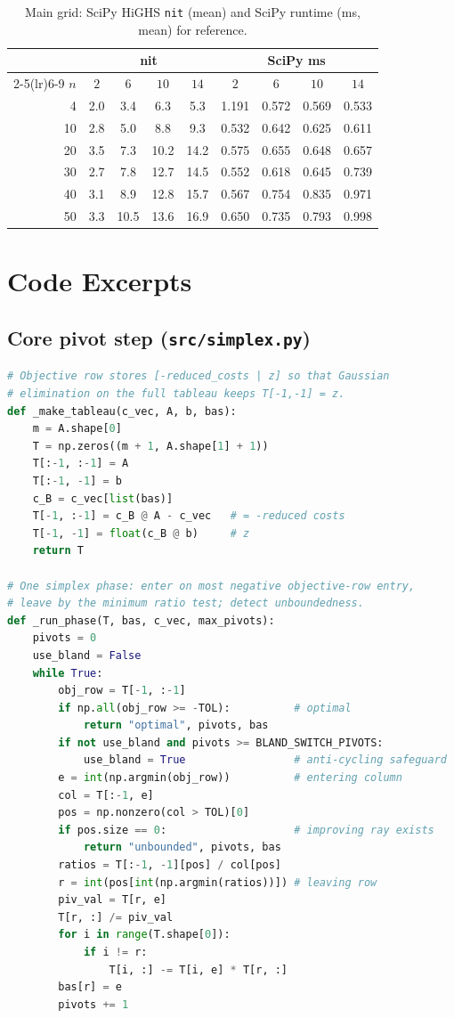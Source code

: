 \documentclass[10pt]{article}
\begin{document}
\begin{table}[h]
\centering
\caption{Main grid: SciPy HiGHS \texttt{nit} (mean) and SciPy runtime
(ms, mean) for reference.}
\label{tab:scipy}
\footnotesize
\begin{tabular}{rcccc|cccc}
\toprule
 & \multicolumn{4}{c}{\textbf{nit}} & \multicolumn{4}{c}{\textbf{SciPy ms}} \\
\cmidrule(lr){2-5}\cmidrule(lr){6-9}
\textbf{$n$} & $2$ & $6$ & $10$ & $14$ & $2$ & $6$ & $10$ & $14$ \\
\midrule
 4 & 2.0 & 3.4 & 6.3 & 5.3 & 1.191 & 0.572 & 0.569 & 0.533 \\
10 & 2.8 & 5.0 & 8.8 & 9.3 & 0.532 & 0.642 & 0.625 & 0.611 \\
20 & 3.5 & 7.3 & 10.2 & 14.2 & 0.575 & 0.655 & 0.648 & 0.657 \\
30 & 2.7 & 7.8 & 12.7 & 14.5 & 0.552 & 0.618 & 0.645 & 0.739 \\
40 & 3.1 & 8.9 & 12.8 & 15.7 & 0.567 & 0.754 & 0.835 & 0.971 \\
50 & 3.3 & 10.5 & 13.6 & 16.9 & 0.650 & 0.735 & 0.793 & 0.998 \\
\bottomrule
\end{tabular}
\end{table}

\section{Code Excerpts}
\label{app:code}

\subsection{Core pivot step (\texttt{src/simplex.py})}
\begin{lstlisting}[language=Python]
# Objective row stores [-reduced_costs | z] so that Gaussian
# elimination on the full tableau keeps T[-1,-1] = z.
def _make_tableau(c_vec, A, b, bas):
    m = A.shape[0]
    T = np.zeros((m + 1, A.shape[1] + 1))
    T[:-1, :-1] = A
    T[:-1, -1] = b
    c_B = c_vec[list(bas)]
    T[-1, :-1] = c_B @ A - c_vec   # = -reduced costs
    T[-1, -1] = float(c_B @ b)     # z
    return T

# One simplex phase: enter on most negative objective-row entry,
# leave by the minimum ratio test; detect unboundedness.
def _run_phase(T, bas, c_vec, max_pivots):
    pivots = 0
    use_bland = False
    while True:
        obj_row = T[-1, :-1]
        if np.all(obj_row >= -TOL):          # optimal
            return "optimal", pivots, bas
        if not use_bland and pivots >= BLAND_SWITCH_PIVOTS:
            use_bland = True                 # anti-cycling safeguard
        e = int(np.argmin(obj_row))          # entering column
        col = T[:-1, e]
        pos = np.nonzero(col > TOL)[0]
        if pos.size == 0:                    # improving ray exists
            return "unbounded", pivots, bas
        ratios = T[:-1, -1][pos] / col[pos]
        r = int(pos[int(np.argmin(ratios))]) # leaving row
        piv_val = T[r, e]
        T[r, :] /= piv_val
        for i in range(T.shape[0]):
            if i != r:
                T[i, :] -= T[i, e] * T[r, :]
        bas[r] = e
        pivots += 1
\end{lstlisting}
\end{document}

